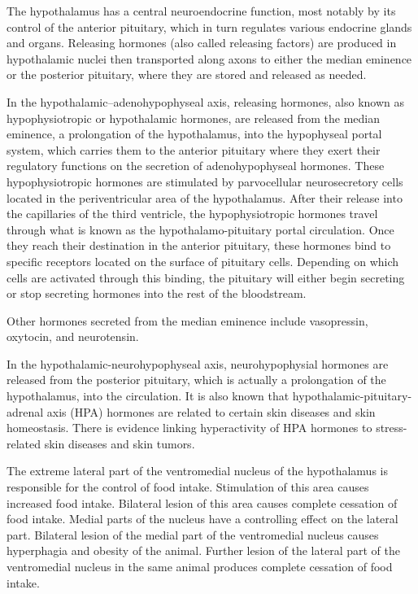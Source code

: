 The hypothalamus has a central neuroendocrine function, most notably by its control of the anterior pituitary, which in turn regulates various endocrine glands and organs. Releasing hormones (also called releasing factors) are produced in hypothalamic nuclei then transported along axons to either the median eminence or the posterior pituitary, where they are stored and released as needed.

In the hypothalamic--adenohypophyseal axis, releasing hormones, also known as hypophysiotropic or hypothalamic hormones, are released from the median eminence, a prolongation of the hypothalamus, into the hypophyseal portal system, which carries them to the anterior pituitary where they exert their regulatory functions on the secretion of adenohypophyseal hormones. These hypophysiotropic hormones are stimulated by parvocellular neurosecretory cells located in the periventricular area of the hypothalamus. After their release into the capillaries of the third ventricle, the hypophysiotropic hormones travel through what is known as the hypothalamo-pituitary portal circulation. Once they reach their destination in the anterior pituitary, these hormones bind to specific receptors located on the surface of pituitary cells. Depending on which cells are activated through this binding, the pituitary will either begin secreting or stop secreting hormones into the rest of the bloodstream.

Other hormones secreted from the median eminence include vasopressin, oxytocin, and neurotensin.

In the hypothalamic-neurohypophyseal axis, neurohypophysial hormones are released from the posterior pituitary, which is actually a prolongation of the hypothalamus, into the circulation. It is also known that hypothalamic-pituitary-adrenal axis (HPA) hormones are related to certain skin diseases and skin homeostasis. There is evidence linking hyperactivity of HPA hormones to stress-related skin diseases and skin tumors.

The extreme lateral part of the ventromedial nucleus of the hypothalamus is responsible for the control of food intake. Stimulation of this area causes increased food intake. Bilateral lesion of this area causes complete cessation of food intake. Medial parts of the nucleus have a controlling effect on the lateral part. Bilateral lesion of the medial part of the ventromedial nucleus causes hyperphagia and obesity of the animal. Further lesion of the lateral part of the ventromedial nucleus in the same animal produces complete cessation of food intake.


